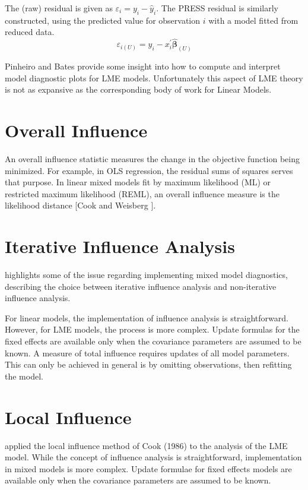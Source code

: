 \documentclass[12pt, a4paper]{report}
\theoremstyle{plain}
\theoremstyle{definition}
\theoremstyle{remark}
\begin{document}
The (raw) residual is given as $\varepsilon_i = y_i - \hat{y}_i$. The PRESS residual is
similarly constructed, using the predicted value for observation $i$ with a model fitted from reduced data.
\[ \varepsilon_{i(U)} = y_i - x^{\prime}_i \boldsymbol{\hat{\beta}}_{(U)} \]




Pinheiro and Bates provide some insight into how to compute and interpret model diagnostic plots for LME models. Unfortunately this aspect of LME theory is not as expansive as the corresponding body of work for Linear Models.


\section{Overall Influence}
An overall influence statistic measures the change in the objective function being minimized. For example, in
OLS regression, the residual sums of squares serves that purpose. In linear mixed models fit by
 maximum likelihood (ML) or  restricted maximum likelihood (REML), an overall influence measure is the  likelihood distance [Cook and Weisberg ].


\section{Iterative Influence Analysis}

\citet{schabenberger} highlights some of the issue regarding implementing mixed model diagnostics, describing  the choice between  iterative influence analysis and  non-iterative influence analysis.

For linear models, the implementation of influence analysis is straightforward. However, for LME models, the process is more complex. Update formulas for the fixed effects are available only when the covariance parameters are assumed to be known. A measure of total influence requires updates of all model parameters. This can only be achieved in general is by omitting observations, then refitting the model.


\section{Local Influence}
\citet{Beckman} applied the local influence method of Cook (1986) to the analysis of the LME model.
While the concept of influence analysis is straightforward, implementation in mixed models is more complex. Update formulae for fixed effects models are available only when the covariance parameters are assumed to be known.
\end{document}
